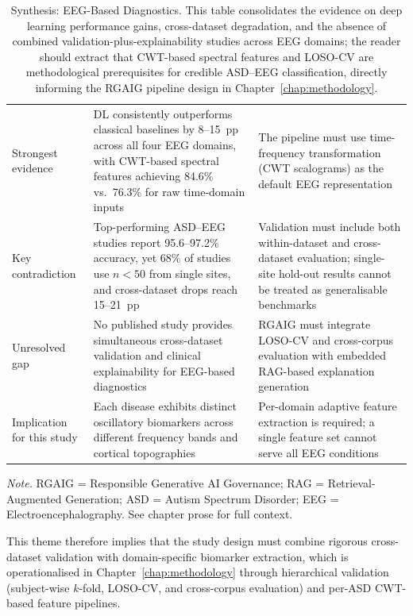 {\tablestripes\tablefontsize
\begin{xltabular}{\textwidth}{@{} p{2.4cm} p{6.2cm} p{5.7cm} @{}}
\caption[Synthesis: EEG-Based Diagnostics]{Synthesis: EEG-Based Diagnostics. This table consolidates the evidence on deep learning performance gains, cross-dataset degradation, and the absence of combined validation-plus-explainability studies across EEG domains; the reader should extract that CWT-based spectral features and LOSO-CV are methodological prerequisites for credible ASD--EEG classification, directly informing the RGAIG pipeline design in Chapter~\ref{chap:methodology}.}\label{tab:synth_eeg_diagnostics} \\
\toprule
{} &  &  \\
\midrule
\endfirsthead
\endhead
\bottomrule
\endlastfoot
Strongest evidence & DL consistently outperforms classical baselines by 8--15~pp across all four EEG domains, with CWT-based spectral features achieving 84.6\% vs.\ 76.3\% for raw time-domain inputs & The pipeline must use time-frequency transformation (CWT scalograms) as the default EEG representation \\
\addlinespace
Key contradiction & Top-performing ASD--EEG studies report 95.6--97.2\% accuracy, yet 68\% of studies use $n < 50$ from single sites, and cross-dataset drops reach 15--21~pp & Validation must include both within-dataset and cross-dataset evaluation; single-site hold-out results cannot be treated as generalisable benchmarks \\
\addlinespace
Unresolved gap & No published study provides simultaneous cross-dataset validation and clinical explainability for EEG-based diagnostics & RGAIG must integrate LOSO-CV and cross-corpus evaluation with embedded RAG-based explanation generation \\
\addlinespace
Implication for this study & Each disease exhibits distinct oscillatory biomarkers across different frequency bands and cortical topographies & Per-domain adaptive feature extraction is required; a single feature set cannot serve all EEG conditions \\
\end{xltabular}}
\vspace{0.3em}\noindent\textit{Note.} RGAIG = Responsible Generative AI Governance; RAG = Retrieval-Augmented Generation; ASD = Autism Spectrum Disorder; EEG = Electroencephalography. See chapter prose for full context.

\noindent This theme therefore implies that the study design must combine rigorous cross-dataset validation with domain-specific biomarker extraction, which is operationalised in Chapter~\ref{chap:methodology} through hierarchical validation (subject-wise $k$-fold, LOSO-CV, and cross-corpus evaluation) and per-ASD CWT-based feature pipelines.

